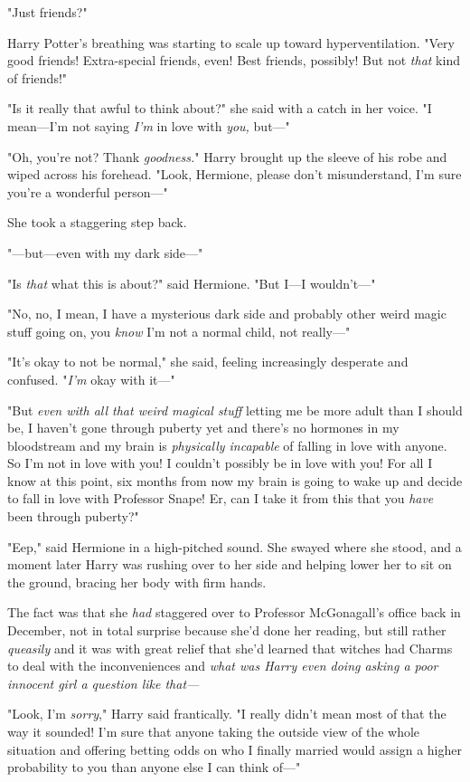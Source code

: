 "Just friends?"

Harry Potter’s breathing was starting to scale up toward hyperventilation.
"Very good friends! Extra-special friends, even! Best friends,
possibly! But not \emph{that} kind of friends!"

"Is it really that awful to think about?" she said with a catch in her voice.
"I mean—I’m not saying \emph{I’m} in love with \emph{you,} but—"

"Oh, you’re not? Thank \emph{goodness.}" Harry brought up the sleeve of his
robe and wiped across his forehead. "Look, Hermione, please don’t
misunderstand, I’m sure you’re a wonderful person—"

She took a staggering step back.

"—but—even with my dark side—"

"Is \emph{that} what this is about?" said Hermione. "But I—I wouldn’t—"

"No, no, I mean, I have a mysterious dark side and probably other weird magic
stuff going on, you \emph{know} I’m not a normal child, not really—"

"It’s okay to not be normal," she said, feeling increasingly desperate and
confused. "\emph{I’m} okay with it—"

"But \emph{even with all that weird magical stuff} letting me be more adult
than I should be, I haven’t gone through puberty yet and there’s no hormones in
my bloodstream and my brain is \emph{physically incapable} of falling in love
with anyone. So I’m not in love with you! I couldn’t possibly be in love with
you! For all I know at this point, six months from now my brain is going to
wake up and decide to fall in love with Professor Snape! Er, can I take it from
this that you \emph{have} been through puberty?"

"Eep," said Hermione in a high-pitched sound. She swayed where she stood, and a
moment later Harry was rushing over to her side and helping lower her to sit on
the ground, bracing her body with firm hands.

The fact was that she \emph{had} staggered over to Professor McGonagall’s
office back in December, not in total surprise because she’d done her reading,
but still rather \emph{queasily} and it was with great relief that she’d
learned that witches had Charms to deal with the inconveniences and \emph{what
was Harry even doing asking a poor innocent girl a question like that—}

"Look, I’m \emph{sorry}," Harry said frantically. "I really didn’t mean most of
that the way it sounded! I’m sure that anyone taking the outside view of the
whole situation and offering betting odds on who I finally married would assign
a higher probability to you than anyone else I can think of—"

